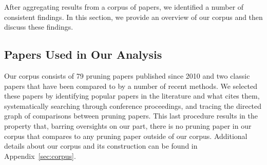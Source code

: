 
% 
% 
% 

% 



\clearpage
\newpage  %
\appendix






\appendix








After aggregating results from a corpus of \npapers papers, we identified a number of consistent findings. In this section, we provide an overview of our corpus and then discuss these findings.

\vspace{-.75mm}
\subsection{Papers Used in Our Analysis}
\vspace{-.25mm}

Our corpus consists of 79 pruning papers published since 2010 and two classic papers \cite{optimal-brain-damage, optimal-brain-surgeon} that have been compared to by a number of recent methods. We selected these papers by identifying popular papers in the literature and what cites them, systematically searching through conference proceedings, and tracing the directed graph of comparisons between pruning papers. This last procedure results in the property that, barring oversights on our part, there is no pruning paper in our corpus that compares to any pruning paper outside of our corpus. Additional details about our corpus and its construction can be found in Appendix~\ref{sec:corpus}.

